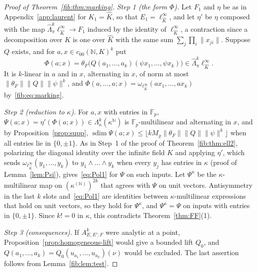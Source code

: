 \documentclass[11pt]{amsart}
\theoremstyle{definition}
\theoremstyle{remark}
\numberwithin{equation}{section}
\newcommand{\N}{\mathbb N}
\newcommand{\F}{\mathbb F}
\newcommand{\linf}{\ell^\infty}
\newcommand{\norm}[1]{\lVert #1\rVert}
\newcommand{\sdim}{\operatorname{sdim}}
\newcommand{\Kh}{\widehat K}
\theoremstyle{plain}
\theoremstyle{definition}
\theoremstyle{plain}
\begin{document}
\begin{proof}[Proof of Theorem~\ref{fib:thm:marking}]
\emph{Step 1 (the form $\Phi$).} Let $F_1$ and $\eta$ be as in Appendix~\ref{app:laurent} for $K_1=\Kh$, so that
$E_1=\linf_{\Kh}$, and let $\eta'$ be $\eta$ composed with the map $\widehat\Lambda^k_\pi\linf_{\Kh}\to F_1$ induced by
the identity of $\linf_{\Kh}$, a contraction since a decomposition over $K$ is one over $\Kh$ with the same sum
$\sum_j\prod_i\norm{x_{ji}}$. Suppose $Q$ exists, and for $a,x\in c_{00}(\N,K)^k$ put
\[
 \Phi(a;x)=\theta_F\bigl(Q(a_1,\dots,a_k)(\psi x_1,\dots,\psi x_k)\bigr)\in\widehat\Lambda^k_\pi\linf_{\Kh}.
\]
It is $k$\nobreakdash-linear in $a$ and in $x$, alternating in $x$, of norm at most $\norm{\theta_F}\norm Q\norm\psi^k$,
and $\Phi(a,\dots,a;x)=\omega_{\linf_{\Kh}}(ax_1,\dots,ax_k)$ by~\eqref{fib:eq:marking}.

\emph{Step 2 (reduction to $\kappa$).} For $a,x$ with entries in $\F_p$, $\Psi(a;x)=\eta'(\Phi(a;x))\in
\Lambda^k_\kappa(\kappa^\N)$ is $\F_p$\nobreakdash-multilinear and alternating in $x$, and by Proposition~\ref{prop:supp},
$\sdim\Psi(a;x)\le\lfloor kM_\varrho\norm{\theta_F}\norm Q\norm\psi^k\rfloor$ when all entries lie in $\{0,\pm1\}$. As in
Step~1 of the proof of Theorem~\ref{fib:thm:ell2}, polarizing the diagonal identity over the infinite field $K$ and
applying $\eta'$, which sends $\omega_{\linf_{\Kh}}(y_1,\dots,y_k)$ to $y_1\wedge\dots\wedge y_k$ when every $y_j$ has
entries in $\kappa$ (proof of Lemma~\ref{lem:Psi}), gives~\eqref{eq:Pol1} for $\Psi$ on such inputs. Let $\Psi^\kappa$ be
the $\kappa$\nobreakdash-multilinear map on $(\kappa^{(\N)})^{2k}$ that agrees with $\Psi$ on unit vectors. Antisymmetry in
the last $k$ slots and~\eqref{eq:Pol1} are identities between $\kappa$\nobreakdash-multilinear expressions that hold on
unit vectors, so they hold for $\Psi^\kappa$, and $\Psi^\kappa=\Psi$ on inputs with entries in $\{0,\pm1\}$. Since $k!=0$
in $\kappa$, this contradicts Theorem~\ref{thm:FF}(1).

\emph{Step 3 (consequences).} If $A^k_{E,E';F}$ were analytic at a point, Proposition~\ref{prop:homogeneous-lift} would
give a bounded lift $Q_0$, and $Q(a_1,\dots,a_k)=Q_0(u_{a_1},\dots,u_{a_k})(\nu)$ would be excluded. The last assertion
follows from Lemma~\ref{fib:lem:test}.
\end{proof}
\end{document}
